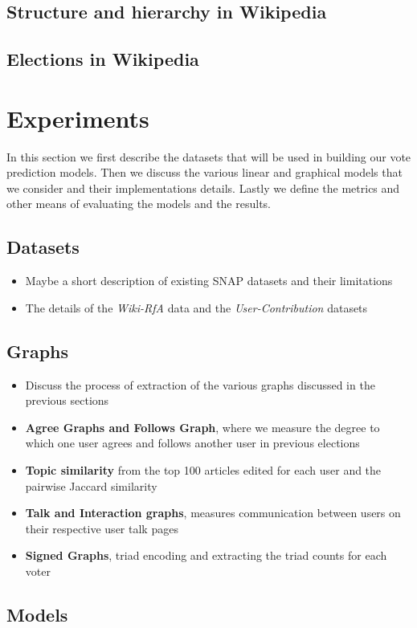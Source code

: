 \section{Structure and hierarchy in Wikipedia}
\section{Elections in Wikipedia}


\chapter{Experiments}
In this section we first describe the datasets that will be used in building our vote prediction models. Then we discuss the various linear and graphical models that we consider and their implementations details. Lastly we define the metrics and other means of evaluating the models and the results.

\section{Datasets}
\begin{itemize}
    \item Maybe a short description of existing SNAP datasets and their limitations
    \item The details of the \textit{Wiki-RfA} data and the \textit{User-Contribution} datasets
\end{itemize}
\section{Graphs}
\begin{itemize}
    \item Discuss the process of extraction of the various graphs discussed in the previous sections
    \item \textbf{Agree Graphs and Follows Graph}, where we measure the degree to which one user agrees and follows another user in previous elections
    \item \textbf{Topic similarity} from the top 100 articles edited for each user and the pairwise Jaccard similarity 
    \item \textbf{Talk and Interaction graphs}, measures communication between users on their respective user talk pages
    \item \textbf{Signed Graphs}, triad encoding and extracting the triad counts for each voter
\end{itemize}
\section{Models}
